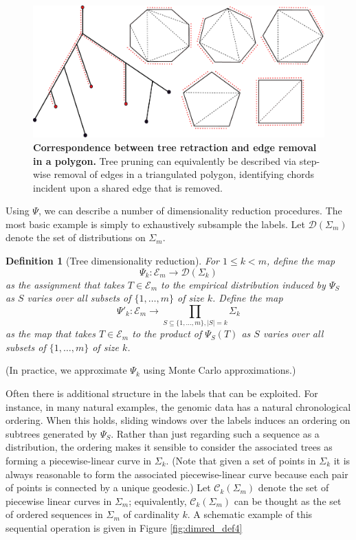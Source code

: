 \documentclass[a4paper,11pt]{article}
\newtheorem{definition}{Definition}
\newcommand{\aC}{\mathcal{C}}
\newcommand{\aD}{\mathcal{D}}
\newcommand{\aE}{\mathcal{E}}
\begin{document}
\begin{figure}
    \centering
    \includegraphics[width=6in]{../figures/dimred_def2.pdf}
    \caption{{\bf Correspondence between tree retraction and edge removal in a polygon.} Tree pruning can equivalently be described via step-wise removal of edges in a triangulated polygon, identifying chords incident upon a shared edge that is removed.}
    \label{fig:dimred_def2}
\end{figure} 

Using $\Psi$, we can describe a number of dimensionality reduction procedures.
The most basic example is simply to exhaustively subsample the labels.
Let $\aD(\Sigma_m)$ denote the set of distributions on $\Sigma_m$.

\begin{definition}[Tree dimensionality reduction]
For $1 \leq k < m$, define the map
\[
\Psi_k \colon \aE_m \to \aD(\Sigma_k)
\]
as the assignment that takes $T \in \aE_m$ to the empirical distribution induced by $\Psi_S$ as $S$ varies over all subsets of $\{1,\ldots,m\}$ of size $k$.
Define the map
\[
\Psi'_k \colon \aE_m \to \prod_{S \subseteq \{1,\ldots,m\}, |S| = k} \Sigma_k 
\]
as the map that takes $T \in \aE_m$ to the product of $\Psi_S(T)$ as $S$ varies over all subsets of $\{1, \ldots, m\}$ of size $k$.
\end{definition}

(In practice, we approximate $\Psi_k$ using Monte Carlo
approximations.)

Often there is additional structure in the labels that can be exploited.
For instance, in many natural examples, the genomic data has a natural chronological ordering.
When this holds, sliding windows over the labels induces an ordering on subtrees generated by $\Psi_S$.
Rather than just regarding such a sequence as a distribution, the ordering makes it sensible to consider the associated trees as forming a piecewise-linear curve in $\Sigma_k$.
(Note that given a set of points in $\Sigma_k$ it is always reasonable to form the associated piecewise-linear curve because each pair of points is connected by a unique geodesic.)
Let $\aC_k(\Sigma_m)$ denote the set of piecewise linear curves in $\Sigma_m$; equivalently, $\aC_k(\Sigma_m)$ can be thought as the set of ordered sequences in $\Sigma_m$ of cardinality $k$.
A schematic example of this sequential operation is given in Figure \ref{fig:dimred_def4}
\end{document}
